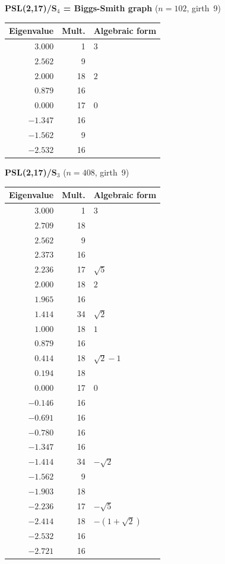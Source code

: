 \documentclass[11pt,a4paper]{article}
\theoremstyle{plain}
\theoremstyle{definition}
\theoremstyle{remark}
\begin{document}
\begin{tcolorbox}[breakable, colback=black!5, colframe=black!5,
  boxrule=0pt, sharp corners]
\bigskip\noindent\textbf{PSL(2,17)/S$_4$ = Biggs-Smith graph} \quad ($n=102$, girth~9)
\smallskip

\begin{center}
\begin{tabular}{rrl}
\toprule
Eigenvalue & Mult. & Algebraic form \\
\midrule
$3.000$ & 1 & $3$ \\
$2.562$ & 9 & \\
$2.000$ & 18 & $2$ \\
$0.879$ & 16 & \\
$0.000$ & 17 & $0$ \\
$-1.347$ & 16 & \\
$-1.562$ & 9 & \\
$-2.532$ & 16 & \\
\bottomrule
\end{tabular}
\end{center}

\bigskip\noindent\textbf{PSL(2,17)/S$_3$} \quad ($n=408$, girth~9)
\smallskip

\begin{center}
\begin{tabular}{rrl}
\toprule
Eigenvalue & Mult. & Algebraic form \\
\midrule
$3.000$ & 1 & $3$ \\
$2.709$ & 18 & \\
$2.562$ & 9 & \\
$2.373$ & 16 & \\
$2.236$ & 17 & $\sqrt{5}$ \\
$2.000$ & 18 & $2$ \\
$1.965$ & 16 & \\
$1.414$ & 34 & $\sqrt{2}$ \\
$1.000$ & 18 & $1$ \\
$0.879$ & 16 & \\
$0.414$ & 18 & $\sqrt{2}-1$ \\
$0.194$ & 18 & \\
$0.000$ & 17 & $0$ \\
$-0.146$ & 16 & \\
$-0.691$ & 16 & \\
$-0.780$ & 16 & \\
$-1.347$ & 16 & \\
$-1.414$ & 34 & $-\sqrt{2}$ \\
$-1.562$ & 9 & \\
$-1.903$ & 18 & \\
$-2.236$ & 17 & $-\sqrt{5}$ \\
$-2.414$ & 18 & $-(1+\sqrt{2})$ \\
$-2.532$ & 16 & \\
$-2.721$ & 16 & \\
\bottomrule
\end{tabular}
\end{center}
\end{tcolorbox}
\end{document}
